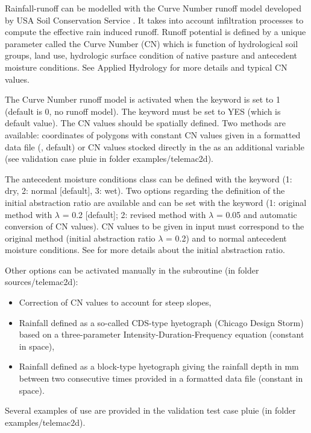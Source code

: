Rainfall-runoff can be modelled with the Curve Number runoff model developed
by USA Soil Conservation Service \cite{soil1972national}. It takes into 
account infiltration processes to compute the effective rain induced runoff.
Runoff potential is defined by a unique parameter called the Curve Number (CN)
which is function of hydrological soil groups, land use, hydrologic surface
condition of native pasture and antecedent moisture conditions.
See Applied Hydrology \citep{chow1988mays} 
for more details and typical CN values. 

The Curve Number runoff model is activated when the keyword
 is set to 1 (default is 0, no runoff model).
The keyword  must be set to YES (which is default value).
The CN values should be spatially defined.
Two methods are available: coordinates of polygons with constant CN values
given in a formatted data file (, default)
or CN values stocked directly in the  as
an additional variable (see validation case pluie in folder examples/telemac2d).

The antecedent moisture conditions class can be defined with the keyword
 (1: dry, 2: normal [default], 3: wet).
Two options regarding the definition of the initial abstraction ratio are
available
and can be set with the keyword 
(1: original method with $\lambda$ = 0.2 [default];
 2: revised method with $\lambda$ = 0.05 and automatic conversion of CN values).
CN values to be given in input must correspond to the original method
(initial abstraction ratio $\lambda$ = 0.2) and to normal antecedent moisture
conditions. See \cite{woodward2003runoff} for more details about the initial
abstraction ratio.

Other options can be activated manually in the 
subroutine (in folder sources/telemac2d):
\begin{itemize}
\item Correction of CN values to account for steep slopes,
\item Rainfall defined as a so-called CDS-type hyetograph (Chicago Design
Storm) based on a three-parameter Intensity-Duration-Frequency equation
(constant in space),
\item Rainfall defined as a block-type hyetograph giving the rainfall depth
in mm between two consecutive times provided in a formatted data file (constant
in space).
\end{itemize}
Several examples of use are provided in the validation test case pluie
(in folder examples/telemac2d).

